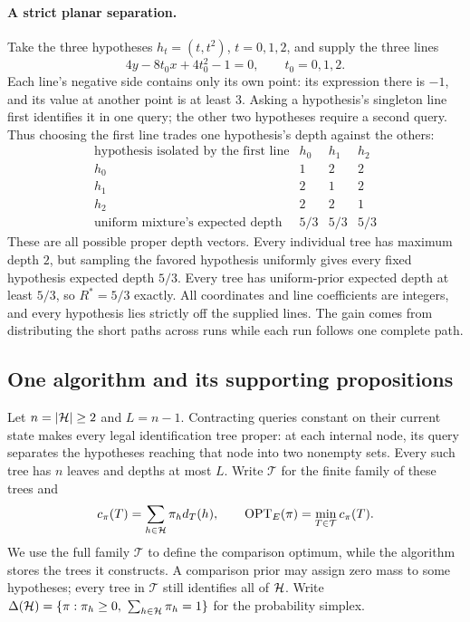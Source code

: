 \paragraph{A strict planar separation.}
Take the three hypotheses $h_t=(t,t^2)$, $t=0,1,2$, and supply the three lines
\[
 4y-8t_0x+4t_0^2-1=0,\qquad t_0=0,1,2.
\]
Each line's negative side contains only its own point: its expression
there is $-1$, and its value at another point is at least $3$.
Asking a hypothesis's singleton line first identifies it in one query;
the other two hypotheses require a second query. Thus choosing the
first line trades one hypothesis's depth against the others:
\[
\begin{array}{c|ccc}
 \text{hypothesis isolated by the first line}&h_0&h_1&h_2\\\hline
 h_0&1&2&2\\
 h_1&2&1&2\\
 h_2&2&2&1\\\hline
 \text{uniform mixture's expected depth}&5/3&5/3&5/3
\end{array}
\]
These are all possible proper depth vectors. Every individual tree
has maximum depth $2$, but sampling the favored hypothesis uniformly
gives every fixed hypothesis expected depth $5/3$. Every tree has
uniform-prior expected depth at least $5/3$, so $R^*=5/3$ exactly.
All coordinates and line coefficients are integers, and every
hypothesis lies strictly off the supplied lines. The gain comes from
distributing the short paths across runs while each run follows one
complete path.

\subsection{One algorithm and its supporting propositions}

Let $n=|\mathcal H|\ge2$ and $L=n-1$. Contracting queries constant on their
current state makes every legal identification tree proper: at each
internal node, its query separates the hypotheses reaching that node
into two nonempty sets. Every such tree has $n$ leaves and depths at
most $L$. Write $\mathcal T$ for the finite family of these trees and
\[
 c_\pi(T)=\sum_{h\in\mathcal H}\pi_h d_T(h),\qquad
 \operatorname{OPT}_E(\pi)=\min_{T\in\mathcal T}c_\pi(T).
\]
We use the full family $\mathcal T$ to define the comparison optimum,
while the algorithm stores the trees it constructs. A comparison prior
may assign zero mass to some hypotheses; every tree in $\mathcal T$
still identifies all of $\mathcal H$.
Write
$\Delta(\HH)=\{\pi:\pi_h\ge0,\ \sum_{h\in\HH}\pi_h=1\}$
for the probability simplex.

